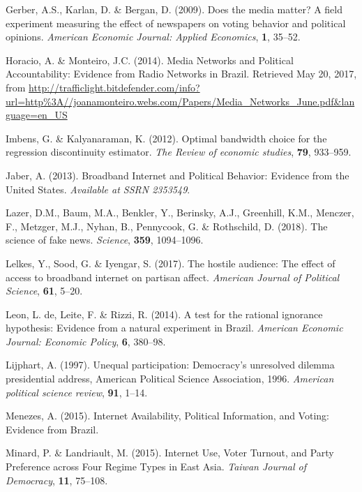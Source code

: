 \documentclass[
  12pt,
]{article}
\begin{document}
\leavevmode\hypertarget{ref-gerber_does_2009}{}%
Gerber, A.S., Karlan, D. \& Bergan, D. (2009). Does the media matter? A
field experiment measuring the effect of newspapers on voting behavior
and political opinions. \emph{American Economic Journal: Applied
Economics}, \textbf{1}, 35--52.

\leavevmode\hypertarget{ref-horacio_media_2014}{}%
Horacio, A. \& Monteiro, J.C. (2014). Media Networks and Political
Accountability: Evidence from Radio Networks in Brazil. Retrieved May
20, 2017, from
\url{http://trafficlight.bitdefender.com/info?url=http\%3A//joanamonteiro.webs.com/Papers/Media_Networks_June.pdf\&language=en_US}

\leavevmode\hypertarget{ref-imbens_optimal_2012}{}%
Imbens, G. \& Kalyanaraman, K. (2012). Optimal bandwidth choice for the
regression discontinuity estimator. \emph{The Review of economic
studies}, \textbf{79}, 933--959.

\leavevmode\hypertarget{ref-jaber_broadband_2013}{}%
Jaber, A. (2013). Broadband Internet and Political Behavior: Evidence
from the United States. \emph{Available at SSRN 2353549}.

\leavevmode\hypertarget{ref-lazer_science_2018}{}%
Lazer, D.M., Baum, M.A., Benkler, Y., Berinsky, A.J., Greenhill, K.M.,
Menczer, F., Metzger, M.J., Nyhan, B., Pennycook, G. \& Rothschild, D.
(2018). The science of fake news. \emph{Science}, \textbf{359},
1094--1096.

\leavevmode\hypertarget{ref-lelkes_hostile_2017}{}%
Lelkes, Y., Sood, G. \& Iyengar, S. (2017). The hostile audience: The
effect of access to broadband internet on partisan affect.
\emph{American Journal of Political Science}, \textbf{61}, 5--20.

\leavevmode\hypertarget{ref-de_leon_test_2014}{}%
Leon, L. de, Leite, F. \& Rizzi, R. (2014). A test for the rational
ignorance hypothesis: Evidence from a natural experiment in Brazil.
\emph{American Economic Journal: Economic Policy}, \textbf{6}, 380--98.

\leavevmode\hypertarget{ref-lijphart_unequal_1997}{}%
Lijphart, A. (1997). Unequal participation: Democracy's unresolved
dilemma presidential address, American Political Science Association,
1996. \emph{American political science review}, \textbf{91}, 1--14.

\leavevmode\hypertarget{ref-menezes_internet_2015}{}%
Menezes, A. (2015). Internet Availability, Political Information, and
Voting: Evidence from Brazil.

\leavevmode\hypertarget{ref-minard_internet_2015}{}%
Minard, P. \& Landriault, M. (2015). Internet Use, Voter Turnout, and
Party Preference across Four Regime Types in East Asia. \emph{Taiwan
Journal of Democracy}, \textbf{11}, 75--108.
\end{document}
